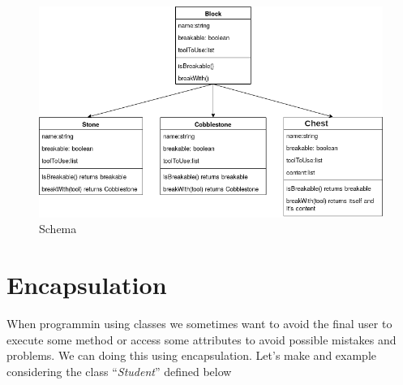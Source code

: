 \documentclass[11pt]{article}
\begin{document}
    \begin{figure}
\centering
\includegraphics{Exercise8.png}
\caption{Schema}
\end{figure}

    \hypertarget{encapsulation}{%
\section{Encapsulation}\label{encapsulation}}

When programmin using classes we sometimes want to avoid the final user
to execute some method or access some attributes to avoid possible
mistakes and problems. We can doing this using encapsulation. Let's make
and example considering the class ``\emph{Student}'' defined below
\end{document}
